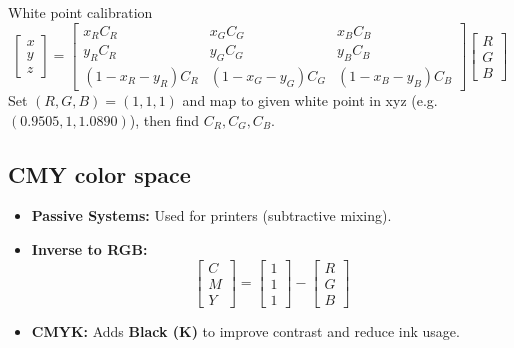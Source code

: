 \documentclass[a4paper,9pt]{article}
\begin{document}
\begin{subbox}{White point calibration}
$$\begin{bmatrix} x \\ y \\ z \end{bmatrix} = \begin{bmatrix} x_R C_R & x_G C_G & x_B C_B \\ y_R C_R & y_G C_G & y_B C_B \\ (1-x_R-y_R) C_R & (1-x_G-y_G) C_G & (1-x_B-y_B) C_B \end{bmatrix} \begin{bmatrix} R \\ G \\ B \end{bmatrix}$$
Set $(R,G,B)=(1,1,1)$ and map to given white point in xyz (e.g. $(0.9505,1,1.0890)$), then find $C_R,C_G,C_B$.
\end{subbox}
\subsection{CMY color space}
\begin{itemize}
    \item \textbf{Passive Systems:} Used for printers (subtractive mixing).
    \item \textbf{Inverse to RGB:}
    \[
    \begin{bmatrix} C \\ M \\ Y \end{bmatrix} = \begin{bmatrix} 1 \\ 1 \\ 1 \end{bmatrix} - \begin{bmatrix} R \\ G \\ B \end{bmatrix}
    \]
    \item \textbf{CMYK:} Adds \textbf{Black (K)} to improve contrast and reduce ink usage.
\end{itemize}
\end{document}

